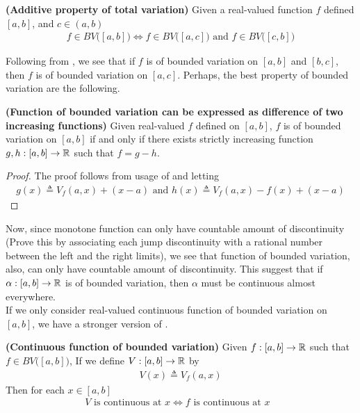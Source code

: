 \documentclass{report}
\begin{document}
\begin{corollary}
\textbf{(Additive property of total variation)} Given a real-valued function $f$  defined $[a,b]$, and $c \in (a,b)$ 
\begin{align*}
f\in BV\big([a,b] \big)\iff f\in BV\big([a,c] \big)\text{ and }f\in BV\big([c,b] \big)
\end{align*}
\end{corollary}
\begin{mdframed}
Following from  , we see that if $f$ is of bounded variation on  $[a,b]$ and $[b,c]$, then $f$ is of bounded variation on $[a,c]$.  Perhaps, the best property of bounded variation are the following.  
\end{mdframed}
\begin{theorem}
\label{Fob}
\textbf{(Function of bounded variation can be expressed as difference of two increasing functions)} Given real-valued $f$ defined on  $[a,b]$, $f$ is of bounded variation on $[a,b]$ if and only if there exists strictly increasing function $g,h:[a,b]\rightarrow \mathbb{R}$ such that $f=g-h$.  
\end{theorem}
\begin{proof}
The proof follows from usage of  and letting  
\begin{align*}
  g(x)\triangleq V_f(a,x)+(x-a)\text{ and }h(x)\triangleq V_f(a,x)-f(x)+(x-a)
\end{align*}
\end{proof}
\begin{mdframed}
Now, since monotone function can only have countable amount of discontinuity (Prove this by associating each jump discontinuity with a rational number between the left and the right limits), we see that function of bounded variation, also, can only have countable amount of discontinuity. This suggest that if $\alpha :[a,b]\rightarrow \mathbb{R}$ is of bounded variation, then $\alpha $ must be continuous almost everywhere. \\

If we only consider real-valued continuous function of bounded variation on $[a,b]$, we have a stronger version of . 
\end{mdframed}
\begin{theorem}
\label{Cfobv}
\textbf{(Continuous function of bounded variation)} Given $f:[a,b]\rightarrow \mathbb{R}$ such that $f\in BV\big([a,b]\big)$, If we define $V:[a,b]\rightarrow \mathbb{R}$ by
\begin{align*}
V(x)\triangleq V_f(a,x)
\end{align*}
Then for each $x \in [a,b]$
\begin{align*}
V\text{ is continuous at }x\iff f\text{ is continuous at $x$ }
\end{align*}
\end{theorem}
\end{document}
